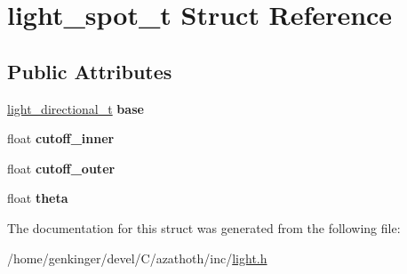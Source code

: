 \hypertarget{structlight__spot__t}{}\section{light\+\_\+spot\+\_\+t Struct Reference}
\label{structlight__spot__t}
\subsection*{Public Attributes}
\begin{DoxyCompactItemize}
\item 
\mbox{\label{structlight__spot__t_a3f2a1a0aeada4fb43b4245dbbc525a18}} 
\mbox{\hyperlink{structlight__directional__t}{light\+\_\+directional\+\_\+t}} {\bfseries base}
\item 
\mbox{\label{structlight__spot__t_ad76408152683ca0d4a83284d0e610dd8}} 
float {\bfseries cutoff\+\_\+inner}
\item 
\mbox{\label{structlight__spot__t_aacaf14ffc0259c5375e677ec6a61d96d}} 
float {\bfseries cutoff\+\_\+outer}
\item 
\mbox{\label{structlight__spot__t_ae88eccb915bb4d524fcd6d4914a10daf}} 
float {\bfseries theta}
\end{DoxyCompactItemize}


The documentation for this struct was generated from the following file\+:\begin{DoxyCompactItemize}
\item 
/home/genkinger/devel/\+C/azathoth/inc/\mbox{\hyperlink{light_8h}{light.\+h}}\end{DoxyCompactItemize}
